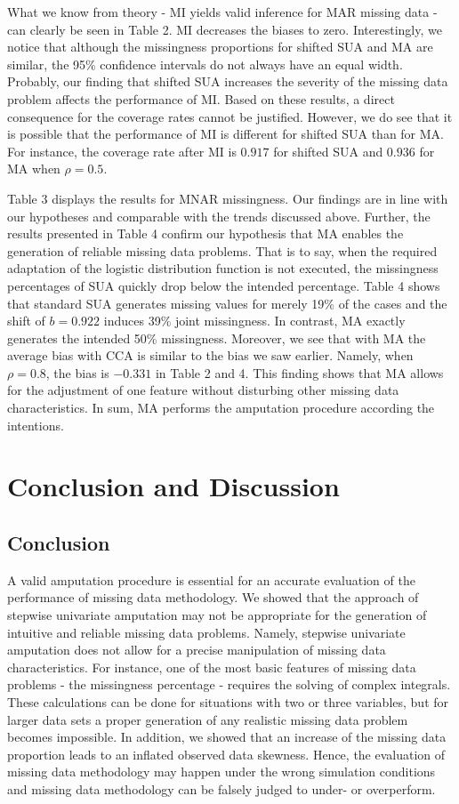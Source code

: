 \documentclass[]{interact}
\begin{document}
What we know from theory - MI yields valid inference for MAR missing data - can clearly be seen in Table 2. MI decreases the biases to zero. Interestingly, we notice that although the missingness proportions for shifted SUA and MA are similar, the 95\% confidence intervals do not always have an equal width. Probably, our finding that shifted SUA increases the severity of the missing data problem affects the performance of MI. Based on these results, a direct consequence for the coverage rates cannot be justified. However, we do see that it is possible that the performance of MI is different for shifted SUA than for MA. For instance, the coverage rate after MI is $0.917$ for shifted SUA and $0.936$ for MA when $\rho = 0.5$.

Table 3 displays the results for MNAR missingness. Our findings are in line with our hypotheses and comparable with the trends discussed above. Further, the results presented in Table 4 confirm our hypothesis that MA enables the generation of reliable missing data problems. That is to say, when the required adaptation of the logistic distribution function is not executed, the missingness percentages of SUA quickly drop below the intended percentage. Table 4 shows that standard SUA generates missing values for merely 19\% of the cases and the shift of $b = 0.922$ induces 39\% joint missingness. In contrast, MA exactly generates the intended 50\% missingness. Moreover, we see that with MA the average bias with CCA is similar to the bias we saw earlier. Namely, when $\rho = 0.8$, the bias is $-0.331$ in Table 2 and 4. This finding shows that MA allows for the adjustment of one feature without disturbing other missing data characteristics. In sum, MA performs the amputation procedure according the intentions.

\section{Conclusion and Discussion}\label{conclusion}

\subsection{\normalsize Conclusion}

A valid amputation procedure is essential for an accurate evaluation of the performance of missing data methodology. We showed that the approach of stepwise univariate amputation may not be appropriate for the generation of intuitive and reliable missing data problems. Namely, stepwise univariate amputation does not allow for a precise manipulation of missing data characteristics. For instance, one of the most basic features of missing data problems - the missingness percentage - requires the solving of complex integrals. These calculations can be done for situations with two or three variables, but for larger data sets a proper generation of any realistic missing data problem becomes impossible. In addition, we showed that an increase of the missing data proportion leads to an inflated observed data skewness. Hence, the evaluation of missing data methodology may happen under the wrong simulation conditions and missing data methodology can be falsely judged to under- or overperform. 
\end{document}
